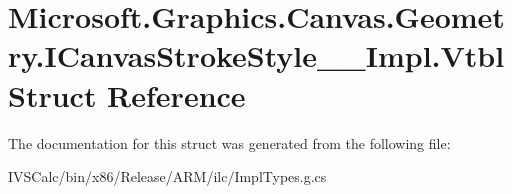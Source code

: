 \hypertarget{struct_microsoft_1_1_graphics_1_1_canvas_1_1_geometry_1_1_i_canvas_stroke_style_____impl_1_1_vtbl}{}\section{Microsoft.\+Graphics.\+Canvas.\+Geometry.\+I\+Canvas\+Stroke\+Style\+\_\+\+\_\+\+Impl.\+Vtbl Struct Reference}
\label{struct_microsoft_1_1_graphics_1_1_canvas_1_1_geometry_1_1_i_canvas_stroke_style_____impl_1_1_vtbl}


The documentation for this struct was generated from the following file\+:\begin{DoxyCompactItemize}
\item 
I\+V\+S\+Calc/bin/x86/\+Release/\+A\+R\+M/ilc/Impl\+Types.\+g.\+cs\end{DoxyCompactItemize}
